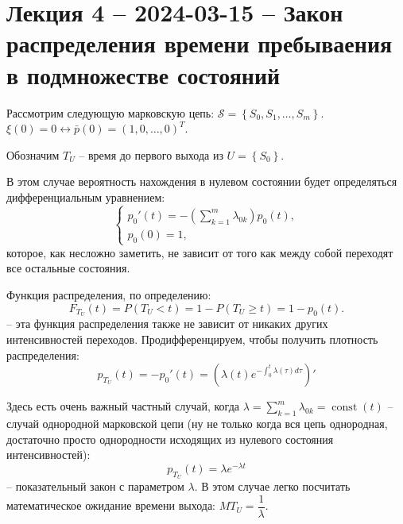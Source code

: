 \section{Лекция 4 -- 2024-03-15 -- Закон распределения времени пребываения в
подмножестве состояний}

\begin{ex}
  Рассмотрим следующую марковскую цепь:
  $\mathcal{S} = \left\{ S_0, S_1, \dots, S_m \right\} $.
  $\xi(0) = 0 \leftrightarrow \bar{p}(0) = (1, 0, \dots, 0)^T$.

  Обозначим $T_U$ -- время до первого выхода из $U = \left\{ S_0 \right\} $.


  В этом случае вероятность нахождения в нулевом состоянии будет определяться
  дифференциальным уравнением:
  \[
    \begin{cases}
      p_0'(t) = - \left( \sum\limits_{k=1}^m \lambda_{0k} \right) p_0(t), \\
      p_0(0) = 1,
    \end{cases}
  \]
  которое, как несложно заметить, не зависит от того как между собой переходят 
  все остальные состояния.

  Функция распределения, по определению:
  \[
    F_{T_U} (t) = P(T_U < t) = 1 - P(T_U \geqslant t) = 1- p_0(t).
  \]
  -- эта функция распределения также не зависит от никаких других 
  интенсивностей переходов. Продифференцируем, чтобы получить плотность распределения:
  \[
    p_{T_U}(t) = - p_0'(t) = \left( \lambda(t) e^{ - \int_0^t \lambda(\tau) d\tau } \right)'
  \]

  Здесь есть очень важный частный случай, когда $\lambda = \sum_{k=1}^m \lambda_{0k} = \operatorname{const}(t)$ -- случай однородной марковской цепи (ну не только когда вся цепь однородная, достаточно просто однородности исходящих из нулевого состояния интенсивностей):
  \[
    p_{T_U}(t) = \lambda e^{-\lambda t}
  \]
  -- показательный закон с параметром $\lambda$. В этом случае легко посчитать
  математическое ожидание времени выхода: $MT_U = \dfrac{1}{\lambda}$.
\end{ex}


